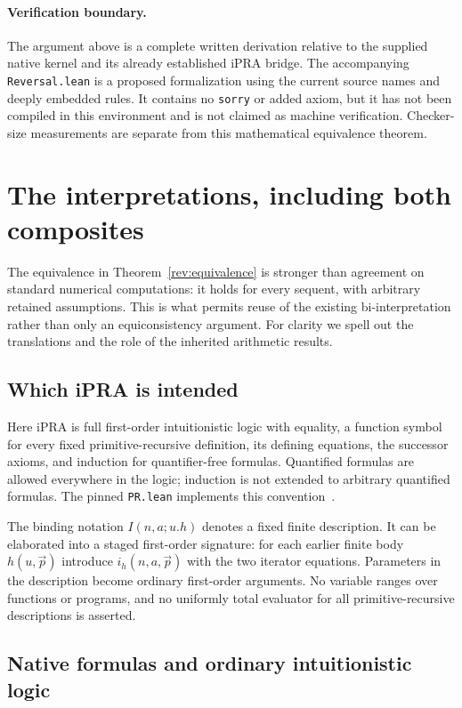 \documentclass[11pt,letterpaper]{article}
\theoremstyle{definition}\newtheorem{definition}[theorem]{Definition}
\theoremstyle{remark}\newtheorem{remark}[theorem]{Remark}
\newcommand{\code}[1]{{\small\nolinkurl{#1}}}
\begin{document}
\paragraph{Verification boundary.}
The argument above is a complete written derivation relative to the
supplied native kernel and its already established iPRA bridge. The
accompanying \texttt{Reversal.lean} is a proposed formalization using
the current source names and deeply embedded rules. It contains no
\texttt{sorry} or added axiom, but it has not been compiled in this
environment and is not claimed as machine verification. Checker-size
measurements are separate from this mathematical equivalence theorem.

\section{The interpretations, including both composites}
\label{sec:interpretations}

The equivalence in Theorem~\ref{rev:equivalence} is stronger than agreement
on standard numerical computations: it holds for every sequent, with
arbitrary retained assumptions. This is what permits reuse of the
existing bi-interpretation rather than only an equiconsistency argument.
For clarity we spell out the translations and the role of the inherited
arithmetic results.

\subsection{Which iPRA is intended}

Here iPRA is full first-order intuitionistic logic with equality, a
function symbol for every fixed primitive-recursive definition, its
defining equations, the successor axioms, and induction for
quantifier-free formulas. Quantified formulas are allowed everywhere
in the logic; induction is not extended to arbitrary quantified formulas.
The pinned \code{PR.lean} implements this convention~\cite{leanbridge}.

The binding notation $I(n,a;u.h)$ denotes a fixed finite description.
It can be elaborated into a staged first-order signature: for each
earlier finite body $h(u,\vec p)$ introduce $i_h(n,a,\vec p)$ with
the two iterator equations. Parameters in the description become
ordinary first-order arguments. No variable ranges over functions or
programs, and no uniformly total evaluator for all primitive-recursive
descriptions is asserted.

\subsection{Native formulas and ordinary intuitionistic logic}
\end{document}
